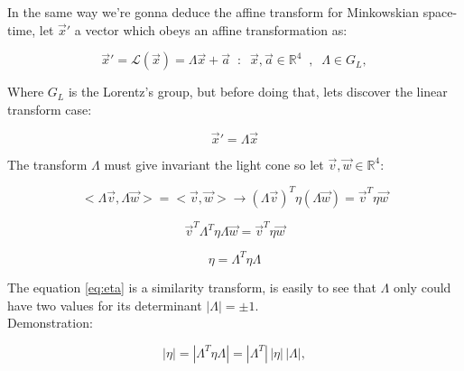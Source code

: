                
                In the same way we're gonna deduce the affine transform for Minkowskian space-time, let $\vec{x}'$ a vector which obeys an affine transformation as:
                
                \begin{equation*}
                    \vec{x}' = \mathcal{L}(\vec{x}) = \Lambda \vec{x} + \vec{a} \;\; :\;\; \vec{x},\vec{a}\in \mathbb{R}^4 \;\;, \;\; \Lambda \in G_L,
                \end{equation*}
                
                Where $G_L$ is the Lorentz's group, but before doing that, lets discover the linear transform case:
                
                \begin{equation}\label{eq:LT}
                    \vec{x}' = \Lambda \vec{x}
                \end{equation}
                
                The transform $\Lambda$ must give invariant the light cone so let $\vec{v} , \vec{w} \in \mathbb{R}^4$:
                
                \begin{equation*}
                    <\Lambda \vec{v} , \Lambda \vec{w} > = <\vec{v} , \vec{w}> \rightarrow (\Lambda \vec{v})^T\eta(\Lambda\vec{w}) = \vec{v}^T \eta \vec{w}
                \end{equation*}
                
                \begin{equation*}
                    \vec{v}^T\Lambda^T\eta\Lambda\vec{w} = \vec{v}^T\eta\vec{w}
                \end{equation*}
                
                \begin{equation}\label{eq:eta}
                    \eta = \Lambda ^T \eta \Lambda
                \end{equation}
                
                The equation \ref{eq:eta} is a similarity transform, is easily to see that $\Lambda$ only could have two values for its determinant $|\Lambda| = \pm 1$. \\
                
                Demonstration:
                
                \begin{equation}\label{eq:deteta}
                    |\eta| = |\Lambda^T\eta\Lambda| = |\Lambda^T|\,|\eta|\,|\Lambda|,
                \end{equation}
                
